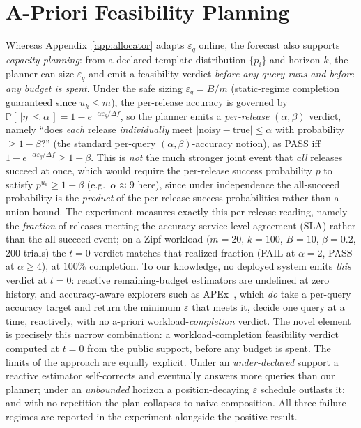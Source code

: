 \documentclass[sigconf,nonacm]{acmart}
\newcommand{\eps}{\varepsilon}
\newcommand{\Prob}{\mathbb{P}}
\begin{document}
\section{A-Priori Feasibility Planning}
\label{app:apriori}

Whereas Appendix~\ref{app:allocator} adapts $\eps_q$ online, the forecast also supports \emph{capacity planning}: from a declared template distribution $\{p_i\}$ and horizon $k$, the planner can size $\eps_q$ and emit a feasibility verdict \emph{before any query runs and before any budget is spent}. Under the safe sizing $\eps_q=B/m$ (static-regime completion guaranteed since $u_k\le m$), the per-release accuracy is governed by $\Prob[\,|\eta|\le\alpha\,]=1-e^{-\alpha\eps_q/\Delta f}$, so the planner emits a \emph{per-release} $(\alpha,\beta)$ verdict, namely ``does \emph{each} release \emph{individually} meet $|\text{noisy}-\text{true}|\le\alpha$ with probability $\ge1-\beta$?'' (the standard per-query $(\alpha,\beta)$-accuracy notion), as PASS iff $1-e^{-\alpha\eps_q/\Delta f}\ge1-\beta$. This is \emph{not} the much stronger joint event that \emph{all} releases succeed at once, which would require the per-release success probability $p$ to satisfy $p^{u_k}\ge1-\beta$ (e.g.\ $\alpha\approx9$ here), since under independence the all-succeed probability is the \emph{product} of the per-release success probabilities rather than a union bound. The experiment measures exactly this per-release reading, namely the \emph{fraction} of releases meeting the accuracy service-level agreement (SLA) rather than the all-succeed event; on a Zipf workload ($m{=}20$, $k{=}100$, $B{=}10$, $\beta{=}0.2$, 200 trials) the $t{=}0$ verdict matches that realized fraction (FAIL at $\alpha{=}2$, PASS at $\alpha\ge4$), at $100\%$ completion. To our knowledge, no deployed system emits \emph{this} verdict at $t{=}0$: reactive remaining-budget estimators are undefined at zero history, and accuracy-aware explorers such as APEx~\cite{ge2019apex}, which \emph{do} take a per-query accuracy target and return the minimum $\eps$ that meets it, decide one query at a time, reactively, with no a-priori workload-\emph{completion} verdict. The novel element is precisely this narrow combination: a workload-completion feasibility verdict computed at $t{=}0$ from the public support, before any budget is spent. The limits of the approach are equally explicit. Under an \emph{under-declared} support a reactive estimator self-corrects and eventually answers more queries than our planner; under an \emph{unbounded} horizon a position-decaying $\eps$ schedule outlasts it; and with no repetition the plan collapses to naive composition. All three failure regimes are reported in the experiment alongside the positive result.
\end{document}
